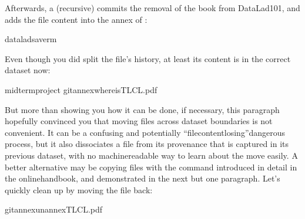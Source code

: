 \sphinxAtStartPar
Afterwards, a (recursive)  commits the removal of the book from
DataLad\sphinxhyphen{}101, and adds the file content into the annex of :

\begin{sphinxVerbatim}[commandchars=\\\{\}]
dataladsave\PYGZhy{}r\PYGZhy{}m
\end{sphinxVerbatim}

\sphinxAtStartPar
Even though you did split the file’s history, at least its content is in the
correct dataset now:

\begin{sphinxVerbatim}[commandchars=\\\{\}]
midterm\PYGZus{}project
gitannexwhereisTLCL.pdf
\end{sphinxVerbatim}

\sphinxAtStartPar
But more than showing you how it can be done, if necessary, this paragraph
hopefully convinced you that moving files across dataset boundaries is not
convenient. It can be a confusing and potentially “file\sphinxhyphen{}content\sphinxhyphen{}losing”\sphinxhyphen{}dangerous
process, but it also dissociates a file from its provenance that is captured
in its previous dataset, with no machine\sphinxhyphen{}readable way to learn about the move
easily. A better alternative may be copying files with the 
command introduced in detail in the online\sphinxhyphen{}handbook, and demonstrated in the next
but one paragraph. Let’s quickly clean up by moving the file back:

\begin{sphinxVerbatim}[commandchars=\\\{\}]
gitannexunannexTLCL.pdf
\end{sphinxVerbatim}

